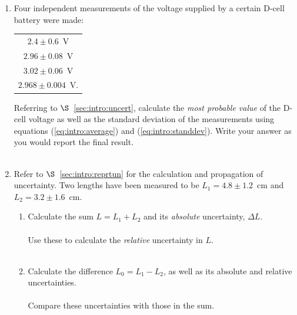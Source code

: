 \begin{enumerate}

\item Four independent measurements 
of the voltage supplied by 
a certain D-cell battery were made:
\vspace*{-5mm}
\begin{center}
\begin{tabular}{c}
$2.4\pm 0.6$~\mbox{V} \\
$2.96\pm 0.08$~\mbox{V} \\ 
$3.02\pm 0.06$~\mbox{V} \\ 
$2.968\pm 0.004$~\mbox{V}.
\end{tabular}
\end{center}
\vspace*{-3mm}
Referring to $\S$~\ref{sec:intro:uncert}, calculate the {\it most probable value}  of the D-cell voltage as well as the
standard deviation of the measurements using equations (\ref{eq:intro:average})
and (\ref{eq:intro:standdev}).  Write your answer as you would report the
final result. \\
\vspace*{5cm}\\

\pagebreak
\item Refer to $\S$~\ref{sec:intro:reprtun} for the calculation and 
propagation of uncertainty.
Two lengths have been measured to be $L_1 = 4.8 \pm 1.2$~cm 
and $L_2 = 3.2 \pm 1.6$~cm. 
\begin{enumerate}
\item Calculate the sum $L=L_1+L_2$ and its {\it absolute} uncertainty, 
$\Delta L$. \\
\vspace*{2cm} \\
\noindent Use these to calculate the {\it relative} uncertainty in $L$. \\
\vspace*{2cm} \\

\item Calculate the difference $L_0=L_1-L_2$, as well as its absolute and
relative uncertainties. \\
\vspace*{2cm} \\
\noindent Compare these uncertainties with those in the sum. \\
\vspace*{2cm} \\


\end{enumerate}
\end{enumerate}
